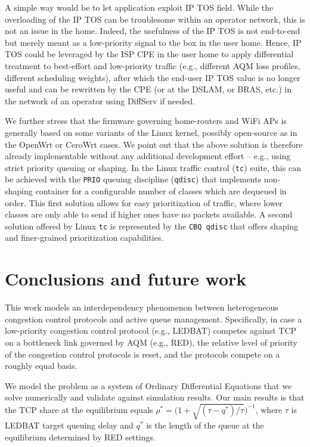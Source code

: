 \documentclass[conference]{IEEEtran}
\newcommand{\secL}[1]{\label{sec:#1}}
\begin{document}
A simple way would be to let application exploit IP TOS field. While the overloading of the IP TOS can be troublesome within an operator network, this is not an issue in the home. Indeed, the usefulness of the IP TOS is not end-to-end but merely meant as a low-priority signal to the box in the user home. Hence, IP TOS could be leveraged by the ISP CPE in the user home to apply differential treatment to best-effort and low-priority traffic (e.g., different AQM loss profiles, different scheduling weights), after which the end-user IP TOS value is no longer useful and can be rewritten by the CPE  (or at the DSLAM, or BRAS, etc.) in the network of an operator using DiffServ if needed.

We further stress that the firmware governing home-routers and WiFi APs is generally based on some variants of the Linux kernel, possibly open-source as in the OpenWrt or CeroWrt cases. We point out that the above solution is therefore already implementable without any additional development effort -- e.g., using strict priority queuing or shaping. In the Linux traffic control (\texttt{tc}) suite, this can be achieved with the \texttt{PRIO} queuing discipline (\texttt{qdisc}) that implements non-shaping container for a configurable number of classes which are dequeued in order. This first solution allows for easy prioritization of traffic, where lower classes are only able to send if higher ones have no packets available. A second solution offered by Linux \texttt{tc} is represented by the \texttt{CBQ qdisc} that offers shaping and finer-grained prioritization capabilities. 




\section{Conclusions and future work}\secL{conclusion}

This work models an interdependency phenomenon between heterogeneous congestion control protocols and active queue management.
Specifically, in case a low-priority congestion control protocol (e.g., LEDBAT) competes against TCP on a bottleneck link governed by AQM (e.g., RED), the relative level of priority of the congestion control protocols is reset, and the protocols compete on a roughly equal basis.

We model the problem as a system of Ordinary Differential Equations that we solve numerically and validate against simulation results. Our main results is that the TCP share at the equilibrium equals $\rho^* = \big(1 + \sqrt{(\tau- q^*)/\tau}\big)^{-1}$, where $\tau$ is LEDBAT target queuing delay and $q^*$ is the length of the queue at the equilibrium determined by RED settings.
\end{document}

